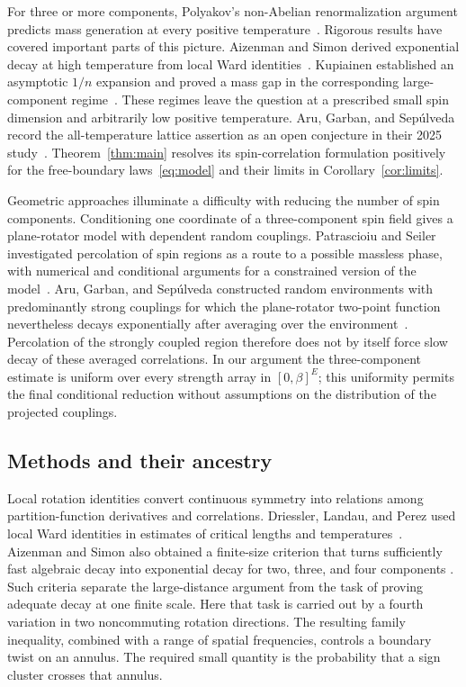 \documentclass[11pt]{article}
\theoremstyle{definition}
\theoremstyle{remark}
\numberwithin{equation}{section}
\begin{document}
For three or more components, Polyakov's non-Abelian renormalization
argument predicts mass generation at every positive
temperature~\cite{Polyakov}. Rigorous results have covered important
parts of this picture. Aizenman and Simon derived exponential decay
at high temperature from local Ward identities~\cite[Section~3]{AizenmanSimonWard}.
Kupiainen established an asymptotic $1/n$ expansion and proved a mass
gap in the corresponding large-component regime~\cite{Kupiainen}.
These regimes leave the question at a prescribed small spin dimension
and arbitrarily low positive temperature. Aru, Garban, and
Sep\'ulveda record the all-temperature lattice assertion as an open
conjecture in their 2025 study~\cite[Introduction, pp.~2--3]{AGS}.
Theorem~\ref{thm:main} resolves its spin-correlation formulation
positively for the free-boundary laws~\eqref{eq:model} and their
limits in Corollary~\ref{cor:limits}.

Geometric approaches illuminate a difficulty with reducing the number
of spin components. Conditioning one coordinate of a three-component
spin field gives a plane-rotator model with dependent random
couplings. Patrascioiu and Seiler investigated percolation of spin
regions as a route to a possible massless phase, with numerical and
conditional arguments for a constrained version of the
model~\cite{PatrascioiuSeiler}. Aru, Garban, and Sep\'ulveda constructed
random environments with predominantly strong couplings for which the
plane-rotator two-point function nevertheless decays exponentially
after averaging over the environment~\cite[Theorem~1.5]{AGS}.
Percolation of the strongly coupled region therefore does not by itself
force slow decay of these averaged correlations. In our argument the
three-component estimate is uniform over every strength array in
$[0,\beta]^E$; this uniformity permits the final conditional reduction
without assumptions on the distribution of the projected couplings.

\subsection{Methods and their ancestry}

Local rotation identities convert continuous symmetry into relations
among partition-function derivatives and correlations. Driessler, Landau, and
Perez used local Ward identities in estimates of critical lengths and
temperatures~\cite{DriesslerLandauPerez}. Aizenman and Simon also
obtained a finite-size criterion that turns sufficiently fast algebraic
decay into exponential decay for two, three, and four components
\cite[Section~4]{AizenmanSimonWard}. Such criteria separate the
large-distance argument from the task of proving adequate decay at
one finite scale. Here that task is carried out by a fourth variation
in two noncommuting rotation directions. The resulting family
inequality, combined with a range of spatial frequencies, controls a
boundary twist on an annulus. The required small quantity is the
probability that a sign cluster crosses that annulus.
\end{document}
